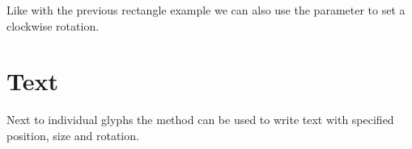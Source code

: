 \documentclass[letterpaper,10pt,english,openany,oneside]{sphinxmanual}
\begin{document}
\noindent{}

\sphinxAtStartPar
Like with the previous rectangle example we can also use the  parameter to set a clockwise rotation.

\begin{sphinxVerbatim}[commandchars=\\\{\}]
     
  
\end{sphinxVerbatim}

\noindent{}


\section{Text}
\label{\detokenize{pages/quickstart:text}}
\sphinxAtStartPar
Next to individual glyphs the {\hyperref[\detokenize{pages/modules:lmd.tools.text}]{}} method can be used to write text with specified position, size and rotation.
\end{document}
